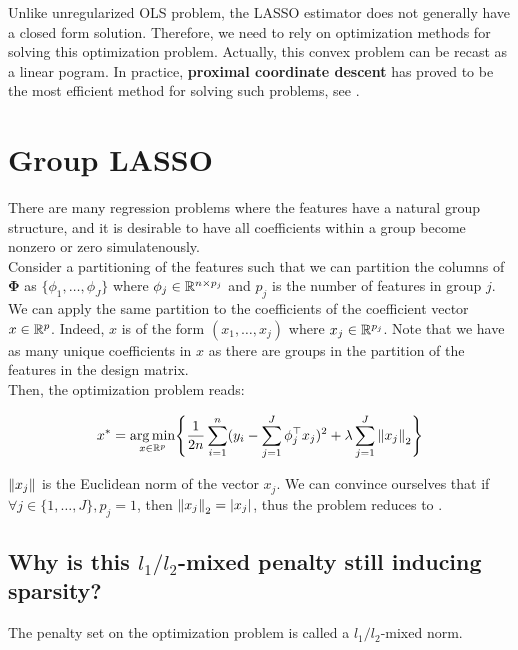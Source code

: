 \documentclass[a4paper,10pt]{article}
\theoremstyle{definition}
\begin{document}
Unlike unregularized OLS problem, the LASSO estimator does not generally have a closed form solution. Therefore, we need to rely on optimization methods for solving this optimization problem. Actually, this convex problem
can be recast as a linear pogram. In practice, \textbf{proximal coordinate descent} has proved to be the most efficient method for solving such problems, see \cite{Bertrand_Massias_Anderson}.

\section{Group LASSO}
\label{section_2}

There are many regression problems where the features have a natural group structure, and it is desirable to have all coefficients within a group become nonzero or zero simulatenously.
\\
Consider a partitioning of the features such that we can partition the columns of $\mathbf{\Phi}$ as $\{\phi_{1}, \dots, \phi_{J}\}$ where $\phi_{j} \in \mathbb{R}^{n \times p_j}$ and
$p_j$ is the number of features in group $j$. We can apply the same partition to the coefficients of the coefficient vector $x \in \mathbb{R}^p$. Indeed, $x$ is of the form $(x_{1}, \dots, x_{j})$ where
$x_{j} \in \mathbb{R}^{p_j}$. Note that we have as many unique coefficients in $x$ as there are groups in the partition of the features in the design matrix.
\\

Then, the optimization problem reads:

\begin{equation*}
    x^* = \operatorname*{arg\,min}_{x \in \mathbb{R}^p} \Biggl\{ \frac{1}{2n} \sum_{i=1}^n (y_i - \sum_{j=1}^J \phi_{j}^\top x_{j})^2 + \lambda \sum_{j=1}^{J} \left \lVert  x_{j} \right \rVert_2 \Biggr\}
\end{equation*}

$ \left \lVert x_{j} \right \rVert$ is the Euclidean norm of the vector $x_{j}$. We can convince ourselves that if $\forall j \in \{1, \dots, J\}, p_j = 1$, then $\left \lVert  x_{j} \right \rVert_2 = \lvert x_{j} \rvert$,
thus the problem reduces to .

\subsection*{Why is this $l_1 / l_2$-mixed penalty still inducing sparsity?}

The penalty set on the optimization problem is called a $l_1/l_2$-mixed norm.
\\
\end{document}
